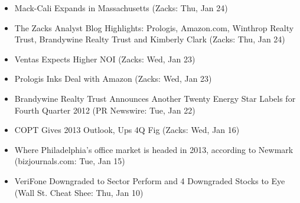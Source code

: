 \documentclass[11pt,asymmetric]{article}
\begin{document}
\begin{itemize}
\item Mack-Cali Expands in Massachusetts (Zacks: Thu, Jan 24)
\item The Zacks Analyst Blog Highlights: Prologis, Amazon.com, Winthrop Realty Trust, Brandywine Realty Trust and Kimberly Clark (Zacks: Thu, Jan 24)
\item Ventas Expects Higher NOI (Zacks: Wed, Jan 23)
\item Prologis Inks Deal with Amazon (Zacks: Wed, Jan 23)
\item Brandywine Realty Trust Announces Another Twenty Energy Star Labels for Fourth Quarter 2012 (PR Newswire: Tue, Jan 22)
\item COPT Gives 2013 Outlook, Ups 4Q Fig (Zacks: Wed, Jan 16)
\item Where Philadelphia’s office market is headed in 2013, according to Newmark (bizjournals.com: Tue, Jan 15)
\item VeriFone Downgraded to Sector Perform and 4 Downgraded Stocks to Eye (Wall St. Cheat Shee: Thu, Jan 10)
\end{itemize}
\end{document}
